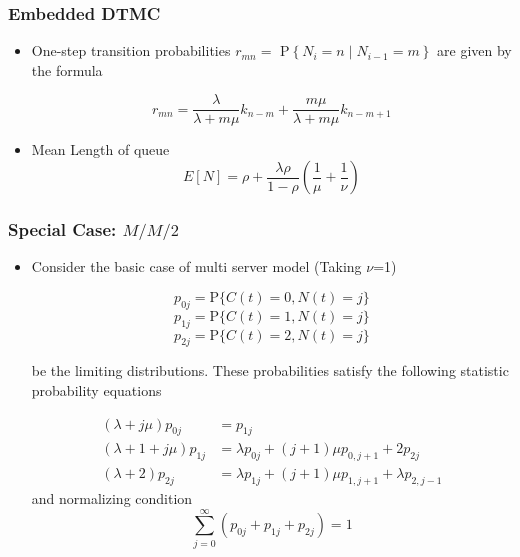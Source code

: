 \documentclass{beamer}
\def \mp {\pause}
\def \mp {}
\newcommand{\ft}[1]{\frametitle{#1}}
\begin{document}
\begin{frame}
 \ft{Embedded DTMC}
\begin{itemize}
\mp \item One-step transition probabilities $r_{m n}=$ $\mathrm{P}\left\{N_{i}=n \mid N_{i-1}=m\right\}$ are given by the formula


\begin{equation*}
r_{m n}=\frac{\lambda}{\lambda+m \mu} k_{n-m}+\frac{m \mu}{\lambda+m \mu} k_{n-m+1} 
\end{equation*}

\mp \item Mean Length of queue 
\[E[N]=\rho+\frac{\lambda \rho}{1-\rho}\left( \frac{1}{\mu}+\frac{1}{\nu}\right)\]

\end{itemize}
\end{frame}

\begin{frame}
 \ft{Special Case: $M/M/2$}
\begin{itemize}\setlength\itemsep{.4em}

\mp \item Consider the basic case of multi server model (Taking $\nu$=1)

\[ p_{0 j}=\mathrm{P}\{C(t)=0, N(t)=j\}\]
\[ p_{1 j}=\mathrm{P}\{C(t)=1, N(t)=j\} \]
\[p_{2 j}=\mathrm{P}\{C(t)=2, N(t)=j\}\]


be the limiting distributions. These probabilities satisfy the following statistic probability equations


\begin{align*}
(\lambda+j \mu) p_{0 j} & =p_{1 j} \\
(\lambda+1+j \mu) p_{1 j} & =\lambda p_{0 j}+(j+1) \mu p_{0, j+1}+2 p_{2 j}  \\
(\lambda+2) p_{2 j} & =\lambda p_{1 j}+(j+1) \mu p_{1, j+1}+\lambda p_{2, j-1} 
\end{align*}
and normalizing condition
\[\sum_{j=0}^{\infty}\left(p_{0 j}+p_{1 j}+p_{2 j}\right)=1 \]
\end{itemize}
\end{frame}
\end{document}
